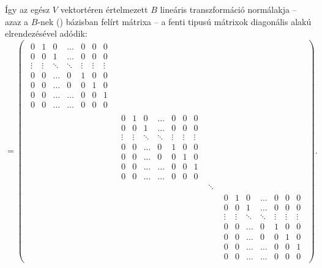 \documentclass[a4paper, showtrims]{memoir}
\theoremstyle{plain}
\theoremstyle{remark}
\theoremstyle{definition}
\begin{document}
Így az egész $V$ vektortéren értelmezett $B$ lineáris transzformáció normálakja
--
azaz a $B$-nek (\dag) bázisban felírt mátrixa
--
a fenti tipusú mátrixok diagonális alakú elrendezésével adódik:
\begin{displaymath}
	[B]=
	\begin{pmatrix}
		\begin{matrix}
			0      & 1      & 0      & \dots  & 0      & 0      & 0      \\
			0      & 0      & 1      & \dots  & 0      & 0      & 0      \\
			\vdots & \vdots & \ddots & \ddots & \vdots & \vdots & \vdots \\
			0      & 0      & \dots  & 0      & 1      & 0      & 0      \\
			0      & 0      & \dots  & 0      & 0      & 1      & 0      \\
			0      & 0      & \dots  & \dots  & 0      & 0      & 1      \\
			0      & 0      & \dots  & \dots  & 0      & 0      & 0
		\end{matrix} &   &        & \\
		                                &
		\begin{matrix}
			0      & 1      & 0      & \dots  & 0      & 0      & 0      \\
			0      & 0      & 1      & \dots  & 0      & 0      & 0      \\
			\vdots & \vdots & \ddots & \ddots & \vdots & \vdots & \vdots \\
			0      & 0      & \dots  & 0      & 1      & 0      & 0      \\
			0      & 0      & \dots  & 0      & 0      & 1      & 0      \\
			0      & 0      & \dots  & \dots  & 0      & 0      & 1      \\
			0      & 0      & \dots  & \dots  & 0      & 0      & 0
		\end{matrix}
		                                &   &          \\
		                                &   & \ddots & \\
		                                &   &        &
		\begin{matrix}
			0      & 1      & 0      & \dots  & 0      & 0      & 0      \\
			0      & 0      & 1      & \dots  & 0      & 0      & 0      \\
			\vdots & \vdots & \ddots & \ddots & \vdots & \vdots & \vdots \\
			0      & 0      & \dots  & 0      & 1      & 0      & 0      \\
			0      & 0      & \dots  & 0      & 0      & 1      & 0      \\
			0      & 0      & \dots  & \dots  & 0      & 0      & 1      \\
			0      & 0      & \dots  & \dots  & 0      & 0      & 0
		\end{matrix}
	\end{pmatrix}.
\end{displaymath}
\end{document}
